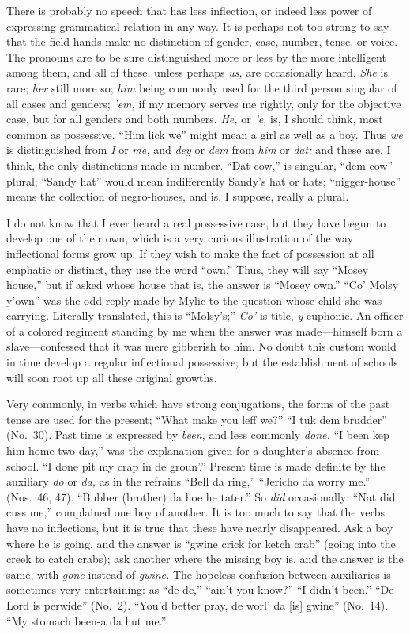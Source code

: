 \documentclass[a5paper,10pt]{book}
\begin{document}
There is probably no speech that has less inflection, or indeed less
power of expressing grammatical relation in any way.  It is perhaps
not too strong to say that the field-hands make no distinction of
gender, case, number, tense, or voice.  The pronouns are to be sure
distinguished more or less by the more intelligent among them, and all
of these, unless perhaps \emph{us,} are occasionally heard.
\emph{She} is rare; \emph{her} still more so; \emph{him} being
commonly used for the third person singular of all cases and genders;
\emph{'em,} if my memory serves me rightly, only for the objective
case, but for all genders and both numbers.  \emph{He,} or \emph{'e,}
is, I should think, most common as possessive.  ``Him lick we'' might
mean a girl as well as a boy.  Thus \emph{we} is distinguished from
\emph{I} or \emph{me,} and \emph{dey} or \emph{dem} from \emph{him} or
\emph{dat;} and these are, I think, the only distinctions made in
number.  ``Dat cow,'' is singular, ``dem cow'' plural; ``Sandy hat''
would mean indifferently Sandy's hat or hats; ``nigger-house'' means
the collection of negro-houses, and is, I suppose, really a plural.

I do not know that I ever heard a real possessive case, but they have
begun to develop one of their own, which is a very curious
illustration of the way inflectional forms grow up.  If they wish to
make the fact of possession at all emphatic or distinct, they use the
word ``own.''  Thus, they will say ``Mosey house,'' but if asked whose
house that is, the answer is ``Mosey own.''  ``Co' Molsy y'own'' was
the odd reply made by Mylie to the question whose child she was
carrying.  Literally translated, this is ``Molsy's;'' \emph{Co'} is
title, \emph{y} euphonic.  An officer of a colored regiment standing
by me when the answer was made---himself born a slave---confessed that
it was mere gibberish to him.  No doubt this custom would in time
develop a regular inflectional possessive; but the establishment of
schools will soon root up all these original growths.

Very commonly, in verbs which have strong conjugations, the forms of
the past tense are used for the present; ``What make you leff we?''
``I tuk dem brudder'' (No.~30).  Past time is expressed by
\emph{been,} and less commonly \emph{done.}  ``I been kep him home two
day,'' was the explanation given for a daughter's absence from school.
``I done pit my crap in de groun'.''  Present time is made definite by
the auxiliary \emph{do} or \emph{da,} as in the refrains ``Bell da
ring,'' ``Jericho da worry me.'' (Nos.~46, 47).  ``Bubber (brother) da
hoe he tater.''  So \emph{did} occasionally: ``Nat did cuss me,''
complained one boy of another.  It is too much to say that the verbs
have no inflections, but it is true that these have nearly
disappeared.  Ask a boy where he is going, and the answer is ``gwine
crick for ketch crab'' (going into the creek to catch crabs); ask
another where the missing boy is, and the answer is the same, with
\emph{gone} instead of \emph{gwine.}  The hopeless confusion between
auxiliaries is sometimes very entertaining: as ``de-de,'' ``ain't you
know?''  ``I didn't been.''  ``De Lord is perwide'' (No.~2).  ``You'd
better pray, de worl' da [is] gwine'' (No.~14).  ``My stomach been-a
da hut me.''
\end{document}
